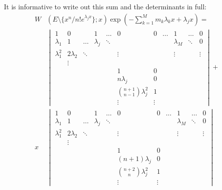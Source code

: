 \documentclass{book}
\begin{document}
It is informative to write out this sum and the determinants in full:
\begin{align*}
W & (E \setminus \{ x^n/n! e^{\lambda_j x} \} ; x) \exp \left ( -\sum_{k=1}^M m_k \lambda_k x + \lambda_j x \right ) = \\
& \begin{vmatrix}
1           & 0           &       & 1         & \dots & 0 & 0 & \dots & 1         & \dots & 0 \\
\lambda_1   & 1           & \dots & \lambda_j &\ddots &   &   &       & \lambda_M &\ddots & 0 \\
\lambda_1^2 & 2 \lambda_2 &\ddots &           &       &\vdots & &     & \vdots    &       & \vdots \\
            & \vdots      &       &           &       &   &   &       &           &       & \\
            &             &       &           &       & 1 & 0 &       &           &       & \\
            &             &       &       & & n \lambda_j & 0 &       &           &       & \\
            &        & & & & \binom{n+1}{n-1} \lambda_j^2 & 1 &       &           &       & \\
            &             &       &           &       &\vdots &\vdots &           &       &
\end{vmatrix} + \\
x & \begin{vmatrix}
1           & 0           &       & 1         & \dots & 0 & 0 & \dots & 1         & \dots & 0 \\
\lambda_1   & 1           & \dots & \lambda_j &\ddots &   &   &       & \lambda_M &\ddots & 0 \\
\lambda_1^2 & 2 \lambda_2 &\ddots &           &       &\vdots & &     & \vdots    &       & \vdots \\
            & \vdots      &       &           &       &   &   &       &           &       & \\
            &             &       &           &       & 1 & 0 &       &           &       & \\
            &             &       &       & & (n+1) \lambda_j & 0 &       &           &       & \\
            &        & & & & \binom{n+2}{n} \lambda_j^2 & 1 &       &           &       & \\
            &             &       &           &       &\vdots &\vdots &           &       &

\end{vmatrix}
\end{align*}
\end{document}
